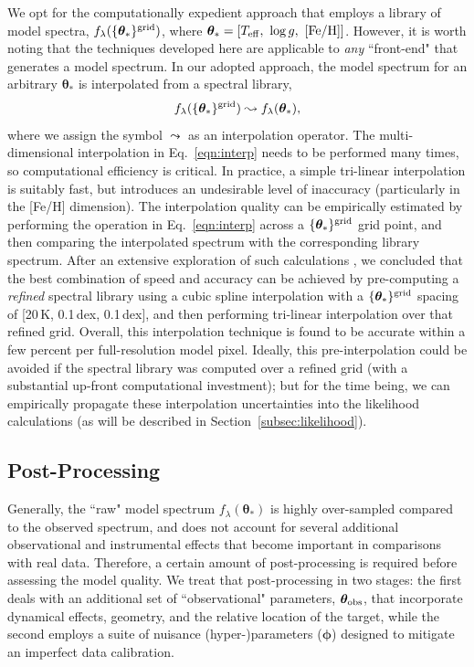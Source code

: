 \documentclass[iop,floatfix]{emulateapj}
\newcommand{\flam}{f_\lambda}
\newcommand{\vt}{ {\bm \theta}}
\newcommand{\vp}{ {\bm \phi}}
\newcommand{\todo}[1]{ \textcolor{blue}{\\TODO: #1}}
\begin{document}
We opt for the computationally expedient approach that employs a library of model spectra, 
$\flam(\{\vt_{\ast}\}^{\rm grid})$, where $\vt_{\ast} = [T_{\rm eff}, \,\, \log{g}, \,\, 
[{\rm Fe/H}]]$.  However, it is worth noting that the techniques developed here are applicable to 
{\it any} ``front-end" that generates a model spectrum.  In our adopted approach, the model 
spectrum for an arbitrary $\vt_{\ast}$ is interpolated from a spectral library, 
\begin{equation} \label{eqn:interp}
\flam(\{\vt_{\ast}\}^{\rm grid}) \leadsto \flam(\vt_{\ast}),
\end{equation}
where we assign the symbol $\leadsto$ as an interpolation operator.  The multi-dimensional 
interpolation in Eq.~\ref{eqn:interp} needs to be performed many times, so computational efficiency 
is critical.  In practice, a simple tri-linear interpolation is suitably fast, but introduces an 
undesirable level of inaccuracy (particularly in the [Fe/H] dimension).  The interpolation quality 
can be empirically estimated by performing the operation in Eq.~\ref{eqn:interp} across a 
$\{\vt_{\ast}\}^{\rm grid}$ grid point, and then comparing the interpolated spectrum with the 
corresponding library spectrum.  After an extensive exploration of such calculations 
\citep[see also][]{husser12}, we concluded that the best combination of speed and accuracy can be 
achieved by pre-computing a {\it refined} spectral library using a cubic spline interpolation with 
a $\{\vt_{\ast}\}^{\rm grid}$ spacing of [20\,K, 0.1\,dex, 0.1\,dex], and then performing 
tri-linear interpolation over that refined grid.  Overall, this interpolation technique is found to 
be accurate within a few percent per full-resolution model pixel.  Ideally, this pre-interpolation 
could be avoided if the spectral library was computed over a refined grid (with a substantial 
up-front computational investment); but for the time being, we can empirically propagate these 
interpolation uncertainties into the likelihood calculations (as will be described in 
Section~\ref{subsec:likelihood}).  


\subsection{Post-Processing} \label{subsec:postprocess}

Generally, the ``raw" model spectrum $\flam(\vt_{\ast})$ is highly over-sampled compared to the 
observed spectrum, and does not account for several additional observational and 
instrumental effects that become important in comparisons with real data.  Therefore, a certain 
amount of post-processing is required before assessing the model quality.  We treat that 
post-processing in two stages: the first deals with an additional set of ``observational" 
parameters, $\vt_{\rm obs}$, that incorporate dynamical effects, geometry, and the relative 
location of the target, while the second employs a suite of nuisance (hyper-)parameters ($\vp$) 
designed to mitigate an imperfect data calibration.
\end{document}
